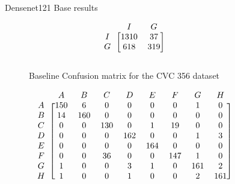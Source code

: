 \begin{figure}[h]
\caption{Densenet121 Base results}
\myfontsize
\caption*{\footnotesize \textmd{ \textbf{A}:{dyed-lifted-polyps} , \textbf{B}:{dyed-resection-margins} , \textbf{C}:{esophagitis} , \textbf{D}:{normal-cecum} , \textbf{E}:{normal-pylorus} , \textbf{F}:{normal-z-line} , \textbf{G}:{polyps} , \textbf{H}:{ulcerative-colitis} , \textbf{I}:{non-polyp}}}

\begin{subfigure}[b]{0.25\textwidth}
     
\[
\begin{blockarray}{ccc}
& I & G  \\
\begin{block}{c[cc]}
        I&1310 &  37\\
        G& 618 &  319\\
\end{block}
\end{blockarray}
 \]         

\caption{Baseline Confusion matrix for the CVC 356 dataset}
\label{mat:cvc356_CM_DN121_base}
\end{subfigure}
\begin{subfigure}[b]{0.49\textwidth}  
\scriptsize     
\[
\begin{blockarray}{ccccccccc}
& A & B & C & D & E & F & G & H \\
\begin{block}{c[cccccccc]}
A&150 & 6 & 0 & 0 & 0 & 0 & 1 & 0\\
B& 14 & 160 & 0 & 0 & 0 & 0 & 0 & 0\\
C&  0 & 0 & 130 & 0 & 1 & 19 & 0 & 0\\
D&  0 & 0 & 0 & 162 & 0 & 0 & 1 & 3\\
E&  0 & 0 & 0 & 0 & 164 & 0 & 0 & 0\\
F&  0 & 0 & 36 & 0 & 0 & 147 & 1 & 0\\
G&  1 & 0 & 0 & 3 & 1 & 0 & 161 & 2\\
H&  1 & 0 & 0 & 1 & 0 & 0 & 2 & 161\\
\end{block}
\end{blockarray}
 \]        
        

\end{subfigure}
\end{figure}
